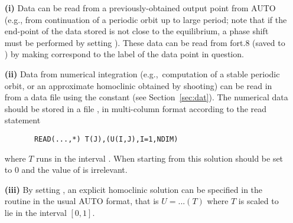 \documentclass[12pt]{report}
\begin{document}
\begin{itemize}

\item[{\bf(i)}]
Data can be read from a previously-obtained output point from {\cal AUTO}
 (e.g., from continuation of a periodic orbit up to large period;
note that if the end-point of the data stored is not close to the
equilibrium, a phase shift must be performed by setting
). These data can be read from fort.8 (saved to ) by making  correspond to the label of the data
point in question.

\item[{\bf(ii)}]
Data from numerical integration (e.g.,\ computation of a stable
periodic orbit, or an approximate homoclinic obtained by shooting)  
can be read in from a data file using the \AUTO constant 
(see Section~\ref{sec:dat}). 
The  numerical data should be stored in
a file  , in multi-column format according to the read statement
\begin{verbatim}
       READ(...,*) T(J),(U(I,J),I=1,NDIM)
\end{verbatim}
where $T$ runs in the interval \parf{[0,1]}.
When starting from this solution  should be set to 0 and 
the value of  is irrelevant.

\item[{\bf(iii)}]
By setting ,  
an explicit homoclinic solution can be specified in the routine  
in the usual {\cal AUTO} format, that is 
$U=...(T)$ where $T$ is scaled to lie in the
interval $[0,1]$. 


\end{itemize}
\end{document}
